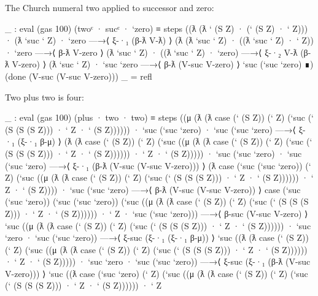 The Church numeral two applied to successor and zero:

\begin{fence}
\begin{code}
_ : eval (gas 100) (twoᶜ · sucᶜ · `zero) ≡
  steps
   ((ƛ (ƛ ` (S Z) · (` (S Z) · ` Z))) · (ƛ `suc ` Z) · `zero
   —→⟨ ξ-·₁ (β-ƛ V-ƛ) ⟩
    (ƛ (ƛ `suc ` Z) · ((ƛ `suc ` Z) · ` Z)) · `zero
   —→⟨ β-ƛ V-zero ⟩
    (ƛ `suc ` Z) · ((ƛ `suc ` Z) · `zero)
   —→⟨ ξ-·₂ V-ƛ (β-ƛ V-zero) ⟩
    (ƛ `suc ` Z) · `suc `zero
   —→⟨ β-ƛ (V-suc V-zero) ⟩
    `suc (`suc `zero)
   ∎)
   (done (V-suc (V-suc V-zero)))
_ = refl
\end{code}
\end{fence}

Two plus two is four:

\begin{fence}
\begin{code}
_ : eval (gas 100) (plus · two · two) ≡
  steps
   ((μ
     (ƛ
      (ƛ
       case (` (S Z)) (` Z) (`suc (` (S (S (S Z))) · ` Z · ` (S Z))))))
    · `suc (`suc `zero)
    · `suc (`suc `zero)
   —→⟨ ξ-·₁ (ξ-·₁ β-μ) ⟩
    (ƛ
     (ƛ
      case (` (S Z)) (` Z)
      (`suc
       ((μ
         (ƛ
          (ƛ
           case (` (S Z)) (` Z) (`suc (` (S (S (S Z))) · ` Z · ` (S Z))))))
        · ` Z
        · ` (S Z)))))
    · `suc (`suc `zero)
    · `suc (`suc `zero)
   —→⟨ ξ-·₁ (β-ƛ (V-suc (V-suc V-zero))) ⟩
    (ƛ
     case (`suc (`suc `zero)) (` Z)
     (`suc
      ((μ
        (ƛ
         (ƛ
          case (` (S Z)) (` Z) (`suc (` (S (S (S Z))) · ` Z · ` (S Z))))))
       · ` Z
       · ` (S Z))))
    · `suc (`suc `zero)
   —→⟨ β-ƛ (V-suc (V-suc V-zero)) ⟩
    case (`suc (`suc `zero)) (`suc (`suc `zero))
    (`suc
     ((μ
       (ƛ
        (ƛ
         case (` (S Z)) (` Z) (`suc (` (S (S (S Z))) · ` Z · ` (S Z))))))
      · ` Z
      · `suc (`suc `zero)))
   —→⟨ β-suc (V-suc V-zero) ⟩
    `suc
    ((μ
      (ƛ
       (ƛ
        case (` (S Z)) (` Z) (`suc (` (S (S (S Z))) · ` Z · ` (S Z))))))
     · `suc `zero
     · `suc (`suc `zero))
   —→⟨ ξ-suc (ξ-·₁ (ξ-·₁ β-μ)) ⟩
    `suc
    ((ƛ
      (ƛ
       case (` (S Z)) (` Z)
       (`suc
        ((μ
          (ƛ
           (ƛ
            case (` (S Z)) (` Z) (`suc (` (S (S (S Z))) · ` Z · ` (S Z))))))
         · ` Z
         · ` (S Z)))))
     · `suc `zero
     · `suc (`suc `zero))
   —→⟨ ξ-suc (ξ-·₁ (β-ƛ (V-suc V-zero))) ⟩
    `suc
    ((ƛ
      case (`suc `zero) (` Z)
      (`suc
       ((μ
         (ƛ
          (ƛ
           case (` (S Z)) (` Z) (`suc (` (S (S (S Z))) · ` Z · ` (S Z))))))
        · ` Z

\end{code}
\end{fence}
